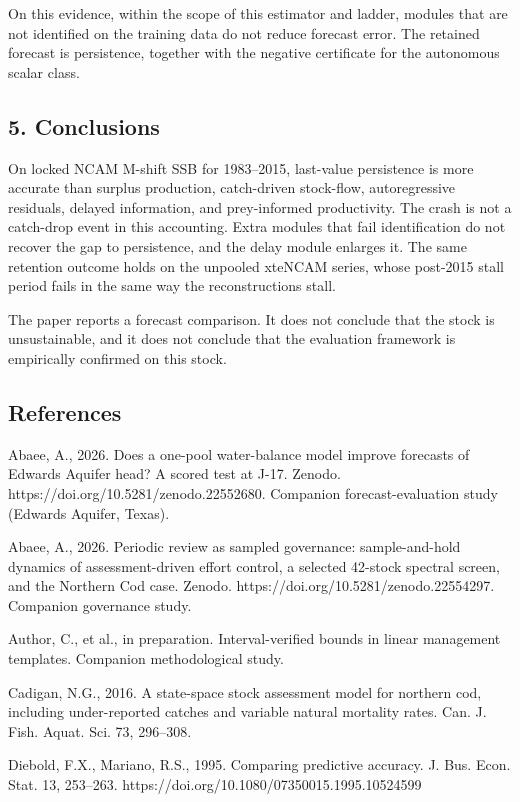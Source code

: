 \documentclass[11pt]{article}
\begin{document}
On this evidence, within the scope of this estimator and ladder, modules
that are not identified on the training data do not reduce forecast
error. The retained forecast is persistence, together with the negative
certificate for the autonomous scalar class.

\subsection{5. Conclusions}\label{conclusions}

On locked NCAM M-shift SSB for 1983--2015, last-value persistence is
more accurate than surplus production, catch-driven stock-flow,
autoregressive residuals, delayed information, and prey-informed
productivity. The crash is not a catch-drop event in this accounting.
Extra modules that fail identification do not recover the gap to
persistence, and the delay module enlarges it. The same
retention outcome holds on the unpooled xteNCAM series, whose post-2015
stall period fails in the same way the reconstructions stall.

The paper reports a forecast comparison. It does not conclude that the
stock is unsustainable, and it does not conclude that the evaluation
framework is empirically confirmed on this stock.

\subsection{References}\label{references}

Abaee, A., 2026. Does a one-pool water-balance model improve forecasts
of Edwards Aquifer head? A scored test at J-17. Zenodo.
https://doi.org/10.5281/zenodo.22552680. Companion forecast-evaluation
study (Edwards Aquifer, Texas).

Abaee, A., 2026. Periodic review as sampled governance: sample-and-hold
dynamics of assessment-driven effort control, a selected 42-stock
spectral screen, and the Northern Cod case. Zenodo.
https://doi.org/10.5281/zenodo.22554297. Companion governance study.

Author, C., et al., in preparation. Interval-verified bounds in linear
management templates. Companion methodological study.

Cadigan, N.G., 2016. A state-space stock assessment model for northern
cod, including under-reported catches and variable natural mortality
rates. Can. J. Fish. Aquat. Sci. 73, 296--308.

Diebold, F.X., Mariano, R.S., 1995. Comparing predictive accuracy. J.
Bus. Econ. Stat. 13, 253--263.
https://doi.org/10.1080/07350015.1995.10524599
\end{document}
